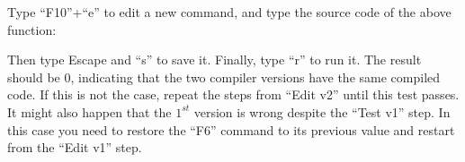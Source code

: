 Type ``F10''+``e'' to edit a new command, and type the source code of
the above function:


\noindent Then type Escape and ``s'' to save it. Finally, type ``r'' to run it.
The result should be 0, indicating that the two compiler versions have the same
compiled code. If this is not the case, repeat the steps from ``Edit v2'' until
this test passes. It might also happen that the $1^{st}$ version is wrong
despite the ``Test v1'' step. In this case you need to restore the ``F6''
command to its previous value and restart from the ``Edit v1'' step.


